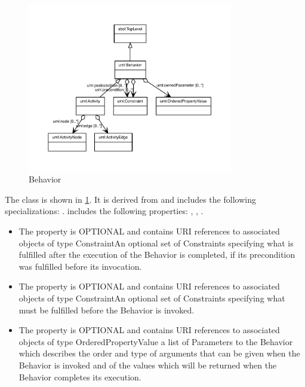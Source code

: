 \begin{figure}[h!]%
\centering%
\includegraphics[width=0.8\textwidth]{uml_classes/Behavior_abstraction_hierarchy.pdf}%
\caption{Behavior}%
\label{fig:Behavior}%
\end{figure}

%
The  class is shown in \ref{fig:Behavior}. It is derived from  and includes the following specializations: . %
 includes the following properties: , , . %
\begin{itemize}%
\item%
The  property is OPTIONAL and contains URI references to associated objects of type ConstraintAn optional set of Constraints specifying what is fulfilled after the execution of the Behavior is completed, if its precondition was fulfilled before its invocation.%
\item%
The  property is OPTIONAL and contains URI references to associated objects of type ConstraintAn optional set of Constraints specifying what must be fulfilled before the Behavior is invoked.%
\item%
The  property is OPTIONAL and contains URI references to associated objects of type OrderedPropertyValue a list of Parameters to the Behavior which describes the order and type of arguments that can be given when the Behavior is invoked and of the values which will be returned when the Behavior completes its execution.%
\end{itemize}%
